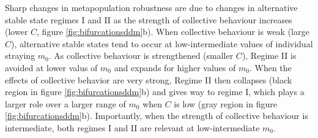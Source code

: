 \documentclass{revtex4}
\begin{document}
Sharp changes in metapopulation robustness are due to changes in alternative stable state regimes I and II as the strength of collective behaviour increases (lower $C$, figure \ref{fig:bifurcationsddm}b). 
When collective behaviour is weak (large $C$), alternative stable states tend to occur at low-intermediate values of individual straying $m_0$.
As collective behaviour is strengthened (smaller $C$), Regime II is avoided at lower valus of $m_0$ and expands for higher values of $m_0$.
When the effects of collective behavior are very strong, Regime II then collapses (black region in figure \ref{fig:bifurcationsddm}b) and gives way to regime I, which plays a larger role over a larger range of $m_0$ when $C$ is low (gray region in figure \ref{fig:bifurcationsddm}b).
Importantly, when the strength of collective behaviour is intermediate, both regimes I and II are relevant at low-intermediate $m_0$.

\end{document}
